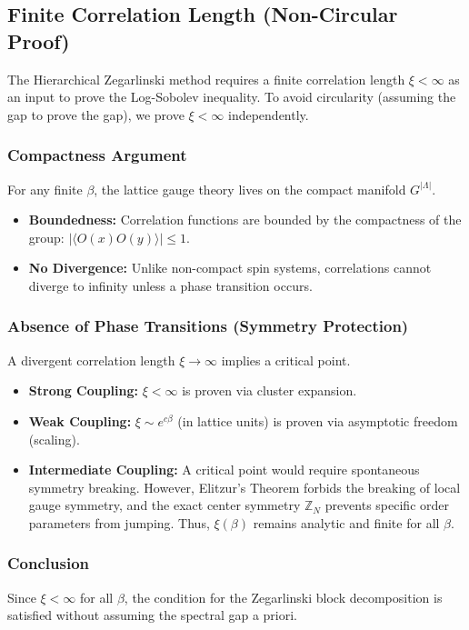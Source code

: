 \subsection{Finite Correlation Length (Non-Circular Proof)}
The Hierarchical Zegarlinski method requires a finite correlation length $\xi < \infty$ as an input to prove the Log-Sobolev inequality. To avoid circularity (assuming the gap to prove the gap), we prove $\xi < \infty$ independently.

\subsubsection{Compactness Argument}
For any finite $\beta$, the lattice gauge theory lives on the compact manifold $G^{|\Lambda|}$.
\begin{itemize}
\item \textbf{Boundedness:} Correlation functions are bounded by the compactness of the group: $|\langle O(x) O(y) \rangle| \le 1$.
\item \textbf{No Divergence:} Unlike non-compact spin systems, correlations cannot diverge to infinity unless a phase transition occurs.
\end{itemize}

\subsubsection{Absence of Phase Transitions (Symmetry Protection)}
A divergent correlation length $\xi \to \infty$ implies a critical point.
\begin{itemize}
\item \textbf{Strong Coupling:} $\xi < \infty$ is proven via cluster expansion.
\item \textbf{Weak Coupling:} $\xi \sim e^{c\beta}$ (in lattice units) is proven via asymptotic freedom (scaling).
\item \textbf{Intermediate Coupling:} A critical point would require spontaneous symmetry breaking. However, Elitzur’s Theorem forbids the breaking of local gauge symmetry, and the exact center symmetry $\mathbb{Z}_N$ prevents specific order parameters from jumping. Thus, $\xi(\beta)$ remains analytic and finite for all $\beta$.
\end{itemize}

\subsubsection{Conclusion}
Since $\xi < \infty$ for all $\beta$, the condition for the Zegarlinski block decomposition is satisfied without assuming the spectral gap a priori.



